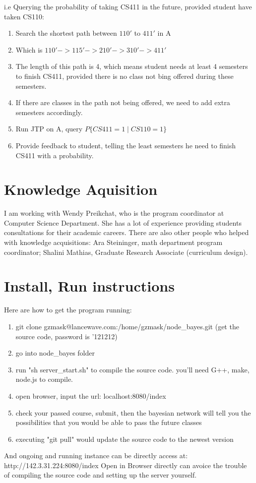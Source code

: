 \documentclass[12pt]{article}
\begin{document}
i.e Querying the probability of taking CS411 in the future, provided student have taken CS110:\\
\begin{enumerate}
	\item Search the shortest path between $110'$ to $411'$ in A
	\item Which is $110' -> 115' -> 210' -> 310' -> 411'$
	\item The length of this path is 4, which means student needs at least 4 semesters to finish CS411, provided there is no class not bing offered during these semesters.
	\item If there are classes in the path not being offered, we need to add extra semesters accordingly.
	\item Run JTP on A, query $P\{CS411 = 1 \mid CS110 = 1\}$
	\item Provide feedback to student, telling the least semesters he need to finish CS411 with a probability.
\end{enumerate}

\section{Knowledge Aquisition}
I am working with Wendy Preikchat, who is the program coordinator at Computer Science Department. She has a lot of experience providing students consultations for their academic careers. There are also other people who helped with knowledge acquisitions: Ara Steininger, math department program coordinator; Shalini Mathias, Graduate Research Associate (curriculum design).


\section{Install, Run instructions}
Here are how to get the program running:
\begin{enumerate}
	\item git clone gzmask@lancewave.com:/home/gzmask/node\_bayes.git  (get the source code, password is '121212)
	\item go into node\_bayes folder
	\item run "sh server\_start.sh" to compile the source code. you'll need G++, make, node.js to compile.
	\item open browser, input the url: localhost:8080/index
	\item check your passed course, submit, then the bayesian network will tell you the possibilities that you would be able to pass the future classes
	\item executing "git pull" would update the source code to the newest version
\end{enumerate}
And ongoing and running instance can be directly  access at: http://142.3.31.224:8080/index    Open in Browser directly can avoice the trouble of compiling the source code and setting up the server yourself.
\end{document}
